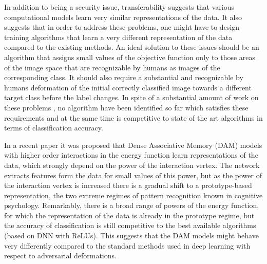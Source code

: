 In addition to being a security issue, transferability suggests that various computational models learn very similar representations of the data. It also suggests that in order to address these problems, one might have to design training algorithms that learn a very different representation of the data compared to the existing methods. An ideal solution to these issues should be an algorithm that assigns small values of the objective function only to those areas of the image space that are recognizable by humans as images of the corresponding class. It should also require a substantial and recognizable by humans deformation of the initial correctly classified image towards a different target class before the label changes. In spite of a substantial amount of work on these problems \cite{Miyato,non-linearity,strong adversary,Nokland,Random Feature Null}, no algorithm have been identified so far which satisfies these requirements and at the same time is competitive to state of the art algorithms in terms of classification accuracy. 

In a recent paper \cite{Krotov Hopfield} it was proposed that Dense Associative Memory (DAM) models with higher order interactions in the energy function learn representations of the data, which strongly depend on the power of the interaction vertex. The network extracts features form the data for small values of this power, but as the power of the interaction vertex is increased there is a gradual shift to a prototype-based representation, the two extreme regimes of pattern recognition known in cognitive psychology. Remarkably, there is a broad range of powers of the energy function, for which the representation of the data is already in the prototype regime, but the accuracy of classification is still competitive to the best available algorithms (based on DNN with ReLUs). This suggests that the DAM models might behave very differently compared to the standard methods used in deep learning with respect to adversarial deformations. 

